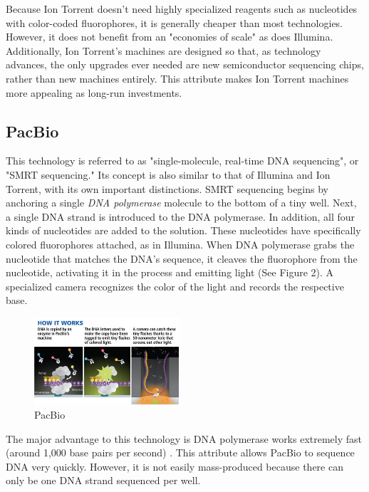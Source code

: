 \documentclass[12pt,letterpaper]{report}
\begin{document}
Because Ion Torrent doesn't need highly specialized reagents such as nucleotides with color-coded fluorophores, it is generally cheaper than most technologies. However, it does not benefit from an "economies of scale" as does Illumina. Additionally, Ion Torrent's machines are designed so that, as technology advances, the only upgrades ever needed are new semiconductor sequencing chips, rather than new machines entirely. This attribute makes Ion Torrent machines more appealing as long-run investments.

\subsection{PacBio}
This technology is referred to as "single-molecule, real-time DNA sequencing", or "SMRT sequencing." Its concept is also similar to that of Illumina and Ion Torrent, with its own important distinctions. SMRT sequencing begins by anchoring a single \textit{DNA polymerase} molecule to the bottom of a tiny well. Next, a single DNA strand is introduced to the DNA polymerase. In addition, all four kinds of nucleotides are added to the solution. These nucleotides have specifically colored fluorophores attached, as in Illumina. When DNA polymerase grabs the nucleotide that matches the DNA's sequence, it cleaves the fluorophore from the nucleotide, activating it in the process and emitting light (See Figure 2). A specialized camera recognizes the color of the light and records the respective base.

\begin{figure}
\vspace{-20pt}
  \begin{center}
    \includegraphics[width=0.48\textwidth]{pacbio_fig.png}
  \end{center}
  \vspace{-20pt}
  \caption[PacBio]{PacBio \protect\cite{pacbiofigure}}
  \vspace{-10pt}
  \label{fig:pacbio}
\end{figure}

The major advantage to this technology is DNA polymerase works extremely fast (around 1,000 base pairs per second) \cite{kelman}. This attribute allows PacBio to sequence DNA very quickly. However, it is not easily mass-produced because there can only be one DNA strand sequenced per well.
\end{document}
